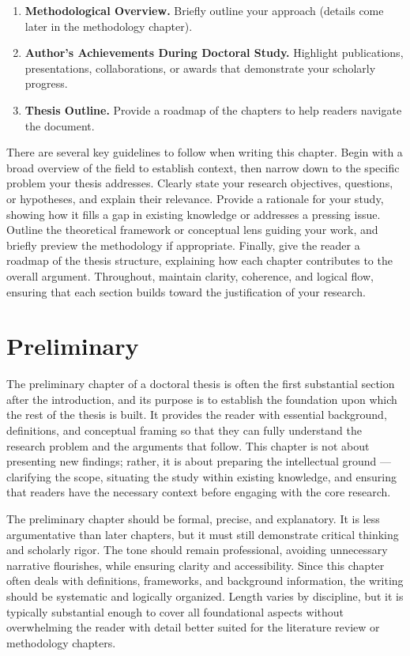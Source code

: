 \documentclass[PCOM,Thesis,Review]{mpThesis}
\newcommand{\Hd}[1]{{\color{SteelBlue}\bf#1.}}
\begin{document}
\begin{MainMatter}
\begin{Remark}
\begin{enumerate}
\item \Hd{Methodological Overview}
Briefly outline your approach (details come later in the methodology chapter).

\item \Hd{Author's Achievements During Doctoral Study}
Highlight publications, presentations, collaborations, or awards that demonstrate your scholarly progress.

\item \Hd{Thesis Outline}
Provide a roadmap of the chapters to help readers navigate the document.
\end{enumerate}

There are several key guidelines to follow when writing this chapter.
Begin with a broad overview of the field to establish context, then narrow down to the specific problem your thesis addresses.
Clearly state your research objectives, questions, or hypotheses, and explain their relevance.
Provide a rationale for your study, showing how it fills a gap in existing knowledge or addresses a pressing issue.
Outline the theoretical framework or conceptual lens guiding your work, and briefly preview the methodology if appropriate.
Finally, give the reader a roadmap of the thesis structure, explaining how each chapter contributes to the overall argument.
Throughout, maintain clarity, coherence, and logical flow, ensuring that each section builds toward the justification of your research.
\end{Remark}

\chapter{Preliminary}
\label{ch:preliminary}
\minitoc

\begin{Remark}
The preliminary chapter of a doctoral thesis is often the first substantial section after the introduction,
and its purpose is to establish the foundation upon which the rest of the thesis is built.
It provides the reader with essential background, definitions, and conceptual framing so that they can fully understand the research problem and the arguments that follow.
This chapter is not about presenting new findings; rather, it is about preparing the intellectual ground ---
clarifying the scope, situating the study within existing knowledge, and ensuring that readers have the necessary context before engaging with the core research.

The preliminary chapter should be formal, precise, and explanatory.
It is less argumentative than later chapters, but it must still demonstrate critical thinking and scholarly rigor.
The tone should remain professional, avoiding unnecessary narrative flourishes, while ensuring clarity and accessibility.
Since this chapter often deals with definitions, frameworks, and background information, the writing should be systematic and logically organized.
Length varies by discipline, but it is typically substantial enough to cover all foundational aspects
without overwhelming the reader with detail better suited for the literature review or methodology chapters.


\end{Remark}
\end{MainMatter}
\end{document}
